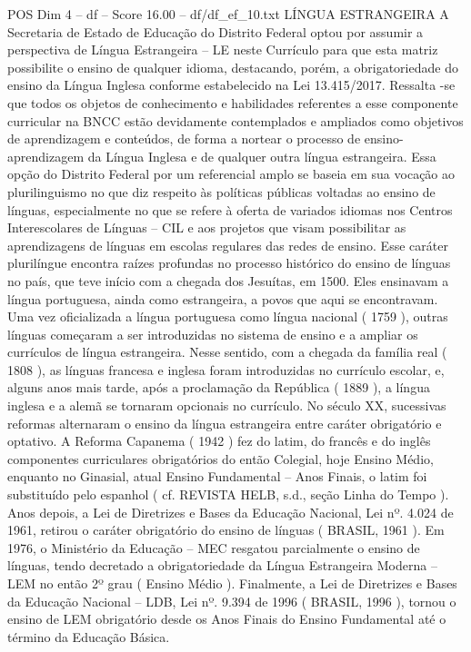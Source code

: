 \begin{textsample}{POS Dim 4 – df – Score 16.00 – df/df\_ef\_10.txt}  \label{ex:f4_pos_221}
LÍNGUA ESTRANGEIRA A Secretaria de Estado de Educação do Distrito Federal optou por assumir a perspectiva de Língua Estrangeira – LE neste Currículo para que esta matriz possibilite o ensino de qualquer idioma, destacando, porém, a obrigatoriedade do ensino da Língua Inglesa conforme estabelecido na Lei 13.415/2017.
Ressalta -se que todos os objetos de conhecimento e habilidades referentes a esse componente curricular na BNCC estão devidamente contemplados e ampliados como objetivos de aprendizagem e conteúdos, de forma a nortear o processo de ensino-aprendizagem da Língua Inglesa e de qualquer outra língua estrangeira.
Essa opção do Distrito Federal por um referencial amplo se baseia em sua vocação ao plurilinguismo no que diz respeito às políticas públicas voltadas ao ensino de línguas, especialmente no que se refere à oferta de variados idiomas nos Centros Interescolares de Línguas – CIL e aos projetos que visam possibilitar as aprendizagens de línguas em escolas regulares das redes de ensino.
Esse caráter plurilíngue encontra raízes profundas no processo histórico do ensino de línguas no país, que teve início com a chegada dos Jesuítas, em 1500.
Eles ensinavam a língua portuguesa, ainda como estrangeira, a povos que aqui se encontravam.
Uma vez oficializada a língua portuguesa como língua nacional ( 1759 ), outras línguas começaram a ser introduzidas no sistema de ensino e a ampliar os currículos de língua estrangeira.
Nesse sentido, com a chegada da família real ( 1808 ), as línguas francesa e inglesa foram introduzidas no currículo escolar, e, alguns anos mais tarde, após a proclamação da República ( 1889 ), a língua inglesa e a alemã se tornaram opcionais no currículo.
No século XX, sucessivas reformas alternaram o ensino da língua estrangeira entre caráter obrigatório e optativo.
A Reforma Capanema ( 1942 ) fez do latim, do francês e do inglês componentes curriculares obrigatórios do então Colegial, hoje Ensino Médio, enquanto no Ginasial, atual Ensino Fundamental – Anos Finais, o latim foi substituído pelo espanhol ( cf.
REVISTA HELB, s.d., seção Linha do Tempo ).
Anos depois, a Lei de Diretrizes e Bases da Educação Nacional, Lei nº. 4.024 de 1961, retirou o caráter obrigatório do ensino de línguas ( BRASIL, 1961 ).
Em 1976, o Ministério da Educação – MEC resgatou parcialmente o ensino de línguas, tendo decretado a obrigatoriedade da Língua Estrangeira Moderna – LEM no então 2º grau ( Ensino Médio ).
Finalmente, a Lei de Diretrizes e Bases da Educação Nacional – LDB, Lei nº. 9.394 de 1996 ( BRASIL, 1996 ), tornou o ensino de LEM obrigatório desde os Anos Finais do Ensino Fundamental até o término da Educação Básica.

\end{textsample}
